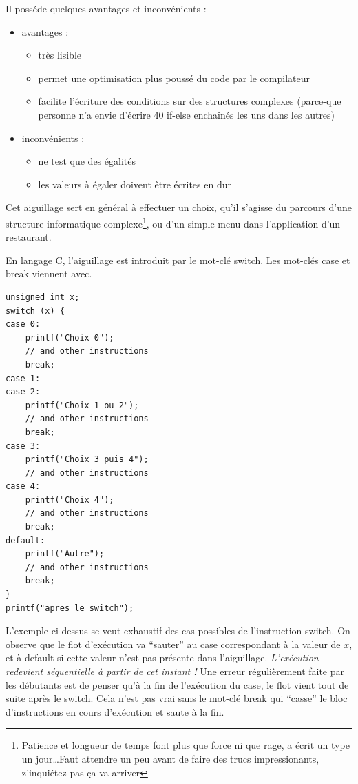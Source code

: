 \documentclass[../../../main.tex]{subfiles}
\begin{document}
Il posséde quelques avantages et inconvénients :
\begin{itemize}
	\item avantages :
	\begin{itemize}
		\item très lisible
		\item permet une optimisation plus poussé du code par le compilateur
		\item facilite l'écriture des conditions sur des structures complexes (parce-que personne n'a envie d'écrire 40 \textsf{if-else} enchaînés les uns dans les autres)
	\end{itemize}
	\item inconvénients : 
	\begin{itemize}
		\item ne test que des égalités
		\item les valeurs à égaler doivent être écrites en dur
	\end{itemize}
\end{itemize}
Cet aiguillage sert en général à effectuer un choix, qu'il s'agisse du parcours d'une structure informatique complexe\footnote{Patience et longueur de temps font plus que force ni que rage, a écrit un type un jour\dots Faut attendre un peu avant de faire des trucs impressionants, z'inquiétez pas ça va arriver}, ou d'un simple menu dans l'application d'un restaurant.
 
En langage C, l'aiguillage est introduit par le mot-clé \textsf{switch}. Les mot-clés \textsf{case} et \textsf{break} viennent avec.
\begin{verbatim}
unsigned int x;
switch (x) {
case 0:
	printf("Choix 0");
	// and other instructions
	break;
case 1:
case 2:
	printf("Choix 1 ou 2");
	// and other instructions
	break;
case 3:
	printf("Choix 3 puis 4");
	// and other instructions
case 4:
	printf("Choix 4");
	// and other instructions
	break;
default:
	printf("Autre");
	// and other instructions
	break;
}
printf("apres le switch");
\end{verbatim}
L'exemple ci-dessus se veut exhaustif des cas possibles de l'instruction \textsf{switch}. On observe que le flot d'exécution va ``sauter'' au \textsf{case} correspondant à la valeur de $x$, et à \textsf{default} si cette valeur n'est pas présente dans l'aiguillage. \textit{L'exécution redevient séquentielle à partir de cet instant !} Une erreur régulièrement faite par les débutants est de penser qu'à la fin de l'exécution du \textsf{case}, le flot vient tout de suite après le switch. Cela n'est pas vrai sans le mot-clé \textsf{break} qui ``casse'' le bloc d'instructions en cours d'exécution et saute à la fin.
 
\end{document}

